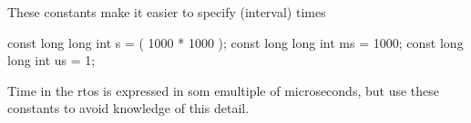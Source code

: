 These constants make it easier to specify (interval) times


\begin{DoxyCode}
\textcolor{keyword}{const} \textcolor{keywordtype}{long} \textcolor{keywordtype}{long} \textcolor{keywordtype}{int}  s = ( 1000 * 1000 );
\textcolor{keyword}{const} \textcolor{keywordtype}{long} \textcolor{keywordtype}{long} \textcolor{keywordtype}{int} ms = 1000;
\textcolor{keyword}{const} \textcolor{keywordtype}{long} \textcolor{keywordtype}{long} \textcolor{keywordtype}{int} us = 1;
\end{DoxyCode}


Time in the rtos is expressed in som emultiple of microseconds, but use these constants to avoid knowledge of this detail. 